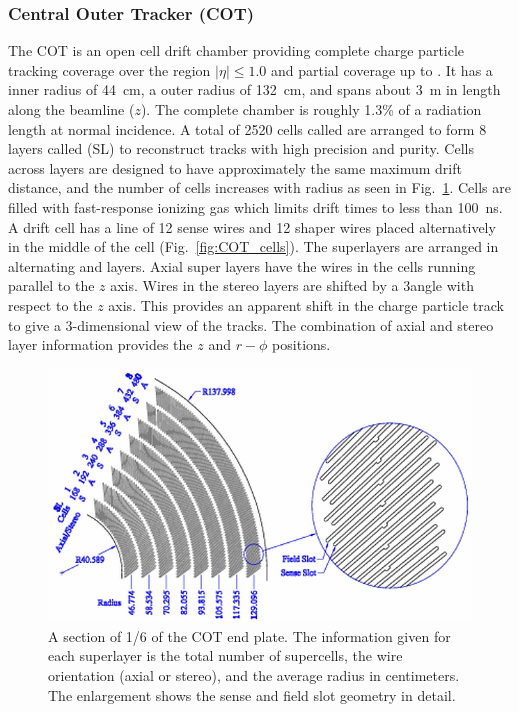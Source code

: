 \subsubsection{Central Outer Tracker (COT)}\label{sec:COT}
The COT \cite{pap:COT} is an open cell drift chamber providing complete charge particle tracking coverage over the region \mbox{$|\eta|\leq1.0$} and partial coverage up to . It has a inner radius of \mbox{44 cm}, a outer radius of \mbox{132 cm}, and spans about 3~m in length along the beamline ($z$). The complete chamber is roughly 1.3\% of a radiation length at normal incidence. A total of 2520 cells called  are arranged to form 8 layers called  (SL) to reconstruct tracks with high precision and purity. Cells across layers are designed to have approximately the same maximum drift distance, and the number of cells increases with radius as seen in Fig.~\ref{fig:COT_endview}. Cells are filled with fast-response ionizing gas which limits drift times to less than 100~ns. A drift cell has a line of 12 sense wires and 12 shaper wires placed alternatively in the middle of the cell (Fig.~\ref{fig:COT_cells}). The superlayers are arranged in alternating  and  layers. Axial super layers have the wires in the cells running parallel to the $z$ axis. Wires in the stereo layers are shifted by a 3\degree angle with respect to the $z$ axis. This provides an apparent shift in the charge particle track to give a 3-dimensional view of the tracks. The combination of axial and stereo layer information provides the $z$ and $r-\phi$ positions.

\begin{figure}[htb!]
 \centering
 \includegraphics[keepaspectratio=true,scale=0.6]{./cot_end.png}
 \caption{A section of 1/6 of the COT end plate. The information given for each superlayer is the total number of supercells, the wire orientation (axial or stereo), and the average radius in centimeters. The enlargement shows the sense and field slot geometry in detail.}
 \label{fig:COT_endview}
\end{figure}

